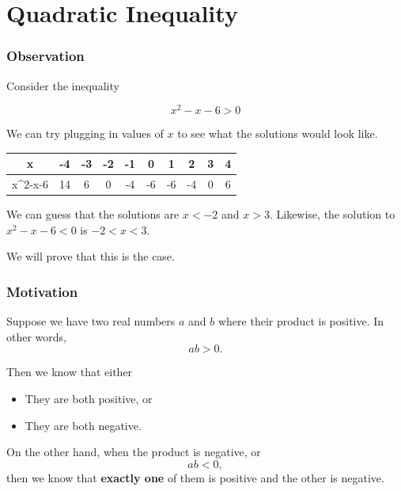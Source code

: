 \section{Quadratic Inequality}
\frame{\sectionpage}

\begin{frame}[t]
\frametitle{Observation}
Consider the inequality
\begin{block}{}
\[x^2 - x - 6 > 0\]
\end{block}
We can try plugging in values of $x$ to see what the solutions would look like.
\begin{slide}
\begin{table}
\centering
\begin{tabular}{C||C|C|C|C|C|C|C|C|C}
x & -4 & -3 & -2 & -1 & 0 & 1 & 2 & 3 & 4\\
\hline
x^2-x-6 & 14 & 6 & 0 & -4 & -6 & -6 & -4 & 0 & 6
\end{tabular}
\end{table}
We can guess that the solutions are $x < -2$ and $x > 3$. Likewise, the solution to $x^2-x-6 < 0$ is $-2 < x < 3$. 
\medskip

We will prove that this is the case.
\end{slide}
\end{frame}

\begin{frame}[t]
\frametitle{Motivation}
Suppose we have two real numbers $a$ and $b$ where their product is positive. In other words,
\[ab > 0.\]
\begin{slide}
Then we know that either 
\begin{itemize}
\item They are both positive, or 
\item They are both negative.
\end{itemize}
On the other hand, when the product is negative, or
\[ab < 0,\]
then we know that \textbf{exactly one} of them is positive and the other is negative.
\end{slide}
\end{frame}

